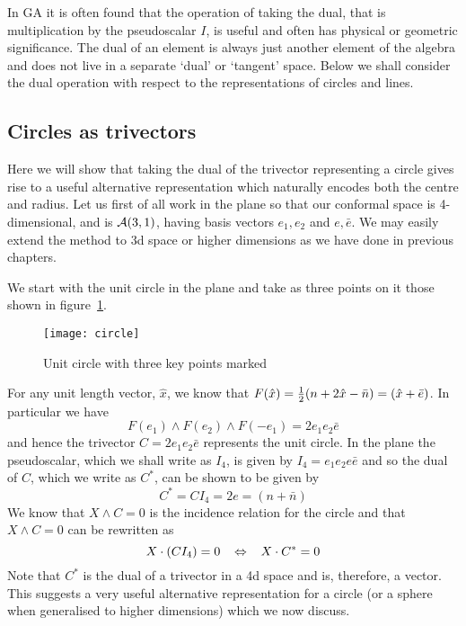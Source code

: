 In GA it is often found that the operation of taking the dual, that
is multiplication by the pseudoscalar $I$, is useful and
often has physical or geometric significance. The dual of an element
is always just another element of the algebra and does not live
in a separate `dual' or `tangent' space. Below we shall consider
the dual operation with respect to the representations of circles 
and lines.

\subsection{Circles as trivectors}

Here we will show that taking the dual of the trivector representing
a circle gives rise to a useful alternative representation which
naturally encodes both the centre and radius.
Let us first of all work in the plane so that our conformal space is
4-dimensional, and is
${\mathcal{A}}(3,1)$, having basis vectors $e_1,e_2$ and $e,\bar{e}$. We may
easily extend the method to 3d space or higher dimensions as we have done
in previous chapters. 

We start with the unit circle in the plane and take as three points
on it those shown in figure~\ref{figcircle}.
\begin{figure}
\centerline{
\texttt{[image: circle]}
} \caption{Unit circle with three key points marked}
\label{figcircle}
\end{figure}
%
For any unit length vector, $\hat{x}$, we know that
$F(\hat{x})= \frac{1}{2} ( n + 2\hat{x} -\bar{n}) = (\hat{x} + \bar{e})$.
In particular we have
%
\[ F(e_1) \wedge F(e_2) \wedge F(-e_1) = 2e_1e_2\bar{e} \]
%
and hence the trivector $C = 2e_1e_2\bar{e}$ represents the unit circle.
In the plane the pseudoscalar, which we shall write as $I_4$,
is given by $I_4 = e_1e_2e\bar{e}$ and so the dual of
$C$, which we write as $C^{*}$, can be shown to be
given by
%
\begin{equation}
 C^{*}=CI_4 = 2e = (n+\bar{n})
 \end{equation}
We know that $X\wedge C=0$ is the incidence relation for the circle  and that
$X \wedge C = 0 $ can be rewritten as
%
\[ X \cdot (CI_4) =0  \;\;\; \Leftrightarrow \;\;\; X\cdot C^{*} = 0  \]
%
Note that $C^{*}$ is the dual of a trivector in a 4d space and is, therefore,
a vector. This suggests a very useful alternative representation
for a circle (or a sphere when generalised to higher dimensions) which we now
discuss.

